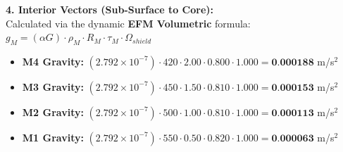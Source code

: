 \documentclass[11pt, a4paper]{article}
\begin{document}
  \vspace{0.5em}
  \noindent \textbf{4. Interior Vectors (Sub-Surface to Core):} \\[0.5em]
  \hspace*{1em} Calculated via the dynamic \textbf{EFM Volumetric} formula: $g_M = (\alpha G) \cdot \rho_{M} \cdot R_M \cdot \tau_M \cdot \Omega_{shield}$
  \begin{itemize}
    \item \textbf{M4 Gravity:} $(2.792 \times 10^{-7}) \cdot 420 \cdot 2.00 \cdot 0.800 \cdot 1.000 = \textbf{0.000188}$ m/s$^2$
    \item \textbf{M3 Gravity:} $(2.792 \times 10^{-7}) \cdot 450 \cdot 1.50 \cdot 0.810 \cdot 1.000 = \textbf{0.000153}$ m/s$^2$
    \item \textbf{M2 Gravity:} $(2.792 \times 10^{-7}) \cdot 500 \cdot 1.00 \cdot 0.810 \cdot 1.000 = \textbf{0.000113}$ m/s$^2$
    \item \textbf{M1 Gravity:} $(2.792 \times 10^{-7}) \cdot 550 \cdot 0.50 \cdot 0.820 \cdot 1.000 = \textbf{0.000063}$ m/s$^2$
  \end{itemize}
\end{document}
